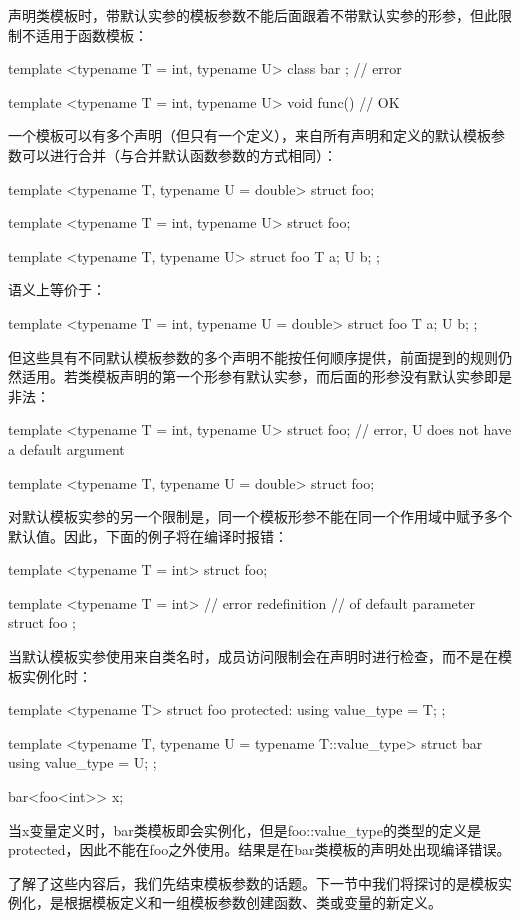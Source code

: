 声明类模板时，带默认实参的模板参数不能后面跟着不带默认实参的形参，但此限制不适用于函数模板：

\begin{cpp}
template <typename T = int, typename U>
class bar { }; // error

template <typename T = int, typename U>
void func() {} // OK
\end{cpp}

一个模板可以有多个声明（但只有一个定义），来自所有声明和定义的默认模板参数可以进行合并（与合并默认函数参数的方式相同）：

\begin{cpp}
template <typename T, typename U = double>
struct foo;

template <typename T = int, typename U>
struct foo;

template <typename T, typename U>
struct foo
{
	T a;
	U b;
};
\end{cpp}

语义上等价于：

\begin{cpp}
template <typename T = int, typename U = double>
struct foo
{
	T a;
	U b;
};
\end{cpp}

但这些具有不同默认模板参数的多个声明不能按任何顺序提供，前面提到的规则仍然适用。若类模板声明的第一个形参有默认实参，而后面的形参没有默认实参即是非法：

\begin{cpp}
template <typename T = int, typename U>
struct foo; // error, U does not have a default argument

template <typename T, typename U = double>
struct foo;
\end{cpp}

对默认模板实参的另一个限制是，同一个模板形参不能在同一个作用域中赋予多个默认值。因此，下面的例子将在编译时报错：

\begin{cpp}
template <typename T = int>
struct foo;

template <typename T = int> // error redefinition
                            // of default parameter
struct foo {};
\end{cpp}

当默认模板实参使用来自类名时，成员访问限制会在声明时进行检查，而不是在模板实例化时：

\begin{cpp}
template <typename T>
struct foo
{
	protected:
	using value_type = T;
};

template <typename T, typename U = typename T::value_type>
struct bar
{
	using value_type = U;
};

bar<foo<int>> x;
\end{cpp}

当x变量定义时，bar类模板即会实例化，但是foo::value\_type的类型的定义是protected，因此不能在foo之外使用。结果是在bar类模板的声明处出现编译错误。

了解了这些内容后，我们先结束模板参数的话题。下一节中我们将探讨的是模板实例化，是根据模板定义和一组模板参数创建函数、类或变量的新定义。








